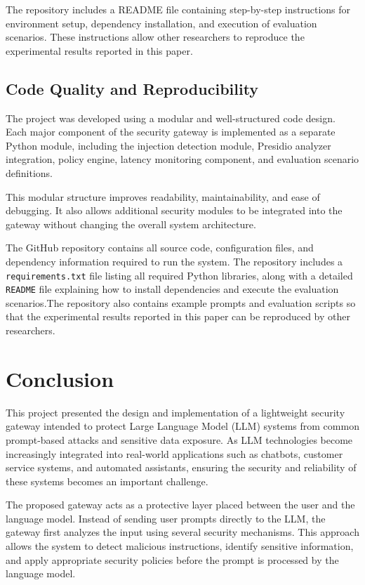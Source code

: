 \documentclass[conference]{IEEEtran}
\begin{document}
The repository includes a README file containing step-by-step instructions for environment setup, dependency installation, and execution of evaluation scenarios. These instructions allow other researchers to reproduce the experimental results reported in this paper.

\subsection{Code Quality and Reproducibility}

The project was developed using a modular and well-structured code design. Each major component of the security gateway is implemented as a separate Python module, including the injection detection module, Presidio analyzer integration, policy engine, latency monitoring component, and evaluation scenario definitions.

This modular structure improves readability, maintainability, and ease of debugging. It also allows additional security modules to be integrated into the gateway without changing the overall system architecture.

The GitHub repository contains all source code, configuration files, and dependency information required to run the system. The repository includes a \texttt{requirements.txt} file listing all required Python libraries, along with a detailed \texttt{README} file explaining how to install dependencies and execute the evaluation scenarios.The repository also contains example prompts and evaluation scripts so that the experimental results reported in this paper can be reproduced by other researchers.


\section{Conclusion}

This project presented the design and implementation of a lightweight security gateway intended to protect Large Language Model (LLM) systems from common prompt-based attacks and sensitive data exposure. As LLM technologies become increasingly integrated into real-world applications such as chatbots, customer service systems, and automated assistants, ensuring the security and reliability of these systems becomes an important challenge.

The proposed gateway acts as a protective layer placed between the user and the language model. Instead of sending user prompts directly to the LLM, the gateway first analyzes the input using several security mechanisms. This approach allows the system to detect malicious instructions, identify sensitive information, and apply appropriate security policies before the prompt is processed by the language model.
\end{document}

